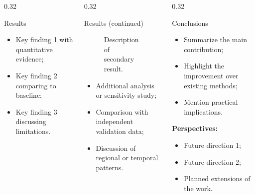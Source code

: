 \documentclass[final]{beamer}
\begin{document}
\begin{frame}{}
\begin{columns}[T]
\begin{column}{0.32\linewidth}
\begin{clsblock}{Results}
      \justifying
      \begin{itemize}
        \item Key finding 1 with quantitative evidence;
        \item Key finding 2 comparing to baseline;
        \item Key finding 3 discussing limitations.
      \end{itemize}
    \end{clsblock}
  \end{column}

  \begin{column}{0.32\linewidth}
    \begin{clsblock}{Results (continued)}
      \begin{figure}
        \centering
        \caption{Description of secondary result.}
      \end{figure}

      \begin{itemize}
        \item Additional analysis or sensitivity study;
        \item Comparison with independent validation data;
        \item Discussion of regional or temporal patterns.
      \end{itemize}
    \end{clsblock}
  \end{column}

  \begin{column}{0.32\linewidth}
    \begin{clsblock}{Conclusions}
      \begin{itemize}
        \item Summarize the main contribution;
        \item Highlight the improvement over existing methods;
        \item Mention practical implications.
      \end{itemize}

      \textbf{Perspectives:}
      \begin{itemize}
        \item Future direction 1;
        \item Future direction 2;
        \item Planned extensions of the work.
      \end{itemize}
    \end{clsblock}


\end{column}
\end{columns}
\end{frame}
\end{document}
